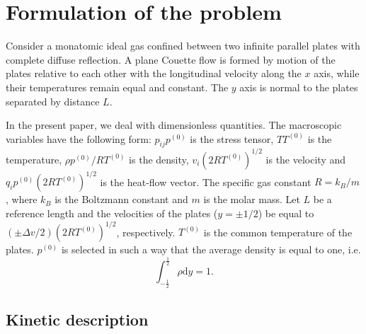 \documentclass[review]{elsarticle}
\newcommand{\dd}{\mathrm{d}}
\begin{document}
\section{Formulation of the problem}

Consider a monatomic ideal gas confined between two infinite parallel plates
with complete diffuse reflection.
A plane Couette flow is formed by motion of the plates relative to each other
with the longitudinal velocity along the \(x\) axis,
while their temperatures remain equal and constant.
The \(y\) axis is normal to the plates separated by distance \(L\).

In the present paper, we deal with dimensionless quantities. The macroscopic variables
have the following form: \(p_{ij}p^{(0)}\) is the stress tensor, \(TT^{(0)}\) is the temperature,
\(\rho p^{(0)}/RT^{(0)}\) is the density, \(v_i(2RT^{(0)})^{1/2}\) is the velocity
and \(q_ip^{(0)}(2RT^{(0)})^{1/2}\) is the heat-flow vector.
The specific gas constant \(R = k_B/m\), where \(k_B\) is the Boltzmann constant
and \(m\) is the molar mass.
Let \(L\) be a reference length and the velocities of the plates (\(y=\pm1/2\))
be equal to \((\pm\Delta{v}/2)(2RT^{(0)})^{1/2}\), respectively.
\(T^{(0)}\) is the common temperature of the plates.
\(p^{(0)}\) is selected in such a way that the average density is equal to one, i.e.
\begin{equation}\label{eq:total_mass}
    \int_{-\frac12}^\frac12\rho\dd{y} = 1.
\end{equation}

\subsection{Kinetic description}
\end{document}
